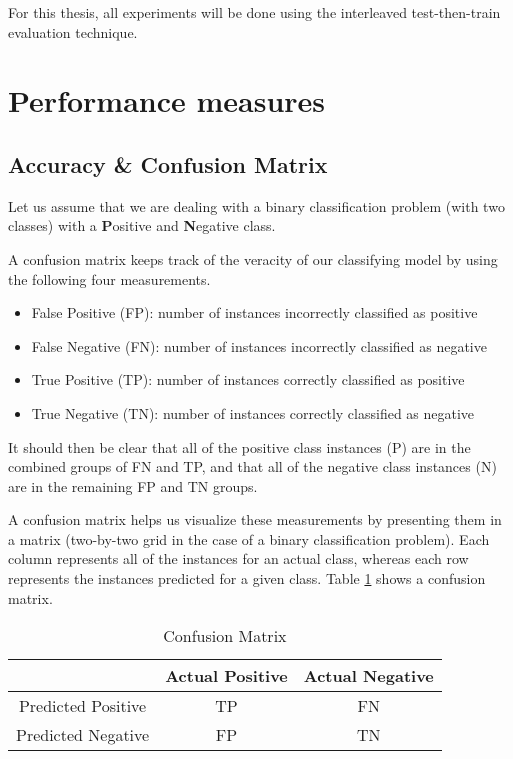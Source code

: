 For this thesis, all experiments will be done using the interleaved test-then-train evaluation technique.

\section{Performance measures\label{section:performance_measures}}


\subsection{Accuracy \& Confusion Matrix}
Let us assume that we are dealing with a binary classification problem (with two classes) with a \textbf{P}ositive and \textbf{N}egative class.

A confusion matrix keeps track of the veracity of our classifying model by using the following four measurements.

\begin{itemize}
\item False Positive (FP): number of instances incorrectly classified as positive
\item False Negative (FN): number of instances incorrectly classified as negative
\item True Positive (TP): number of instances correctly classified as positive
\item True Negative (TN): number of instances correctly classified as negative
\end{itemize}

It should then be clear that all of the positive class instances (P) are in the combined groups of FN and TP, and that all of the negative class instances (N) are in the remaining FP and TN groups.

A confusion matrix helps us visualize these measurements by presenting them in a matrix (two-by-two grid in the case of a binary classification problem). Each column represents all of the instances for an actual class, whereas each row represents the instances predicted for a given class. Table \ref{table:confusion_matrix} shows a confusion matrix.

\begin{table}[]
\centering
\caption{Confusion Matrix\label{table:confusion_matrix}}
\begin{tabular}{|c|c|c|}
\hline
                   & Actual Positive & Actual Negative \\ \hline
Predicted Positive & TP              & FN              \\ \hline
Predicted Negative & FP              & TN              \\ \hline
\end{tabular}
\end{table}

